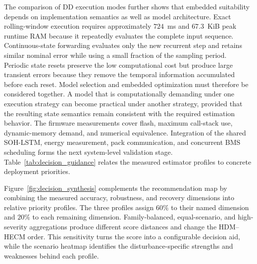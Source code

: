 \documentclass[review,nopreprintline]{elsarticle}
\begin{document}
The comparison of DD execution modes further shows that embedded suitability depends on implementation semantics as well as model architecture. Exact rolling-window execution requires approximately $724$~ms and $67.3$~KiB peak runtime RAM because it repeatedly evaluates the complete input sequence. Continuous-state forwarding evaluates only the new recurrent step and retains similar nominal error while using a small fraction of the sampling period. Periodic state resets preserve the low computational cost but produce large transient errors because they remove the temporal information accumulated before each reset. Model selection and embedded optimization must therefore be considered together. A model that is computationally demanding under one execution strategy can become practical under another strategy, provided that the resulting state semantics remain consistent with the required estimation behavior. The firmware measurements cover flash, maximum call-stack use, dynamic-memory demand, and numerical equivalence. Integration of the shared SOH-LSTM, energy measurement, pack communication, and concurrent BMS scheduling forms the next system-level validation stage. Table~\ref{tab:decision_guidance} relates the measured estimator profiles to concrete deployment priorities.

Figure~\ref{fig:decision_synthesis} complements the recommendation map by combining the measured accuracy, robustness, and recovery dimensions into relative priority profiles. The three profiles assign $60\%$ to their named dimension and $20\%$ to each remaining dimension. Family-balanced, equal-scenario, and high-severity aggregations produce different score distances and change the HDM--HECM order. This sensitivity turns the score into a configurable decision aid, while the scenario heatmap identifies the disturbance-specific strengths and weaknesses behind each profile.
\end{document}

